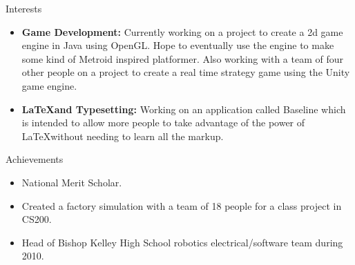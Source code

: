 \documentclass[10pt,oneside]{article}
\newenvironment{ressection}[1]{
	\vspace{4pt}
	{\fontfamily{phv}\selectfont\Large#1}
	\begin{itemize}
	\vspace{3pt}
}{
	\end{itemize}
}
\newcommand{\resitem}[1]{
	\vspace{-4pt}
	\item \begin{flushleft} #1 \end{flushleft}
}
\begin{document}
\begin{ressection}{Interests}
	\resitem{\textbf{Game Development:}  Currently working on a project to create a 2d game engine in Java using OpenGL.  Hope to eventually use the engine to make some kind of Metroid inspired platformer.  Also working with a team of four other people on a project to create a real time strategy game using the Unity game engine.}
	\resitem{\textbf{\LaTeX and Typesetting:} Working on an application called Baseline which is intended to allow more people to take advantage of the power of \LaTeX without needing to learn all the markup.} 
\end{ressection}


\begin{ressection}{Achievements}


	\resitem{National Merit Scholar.}
	
	\resitem{Created a factory simulation with a team of 18 people for a class project in CS200.}
	
	\resitem{Head of Bishop Kelley High School robotics electrical/software team during 2010.}

\end{ressection}
\end{document}
